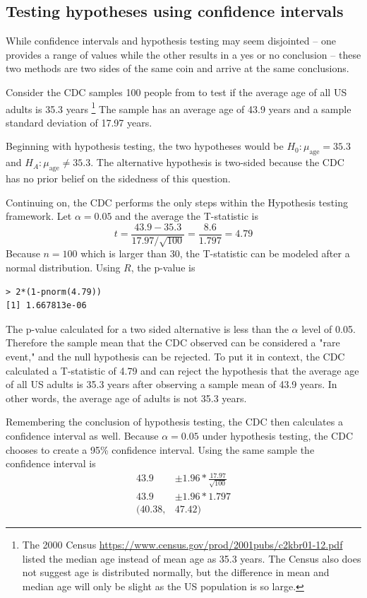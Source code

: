 \subsection{Testing hypotheses using confidence intervals}
\label{utilizingOurCI}

While confidence intervals and hypothesis testing may seem disjointed -- one provides a range of values while the other results in a yes or no conclusion -- these two methods are two sides of the same coin and arrive at the same conclusions. 
	
Consider the CDC  samples 100 people from  to test if the average age of all US adults is 35.3 years \footnote{The 2000 Census \url{https://www.census.gov/prod/2001pubs/c2kbr01-12.pdf} listed the median age instead of mean age as 35.3 years. The Census also does not suggest age is distributed normally, but the difference in mean and median age will only be slight as the US population is so large.} The sample has an average age of 43.9 years and a sample standard deviation of 17.97 years.

Beginning with hypothesis testing, the two hypotheses would be $H_0: \mu_{\mathrm{age}}=35.3$ and $H_A: \mu_{\mathrm{age}} \neq 35.3$. The alternative hypothesis is two-sided because the CDC has no prior belief on the sidedness of this question. 

Continuing on, the CDC performs the only steps within the Hypothesis testing framework. Let $\alpha = 0.05$ and the average the T-statistic is \[t = \frac{43.9-35.3}{17.97/\sqrt{100}}= \frac{8.6}{1.797} = 4.79\] Because $n=100$ which is larger than 30, the T-statistic can be modeled after a normal distribution. Using $R$, the p-value is \begin{verbatim}
> 2*(1-pnorm(4.79))
[1] 1.667813e-06
\end{verbatim}
The p-value calculated for a two sided alternative is less than the $\alpha$ level of 0.05. Therefore the sample mean that the CDC observed can be considered a "rare event," and the null hypothesis can be rejected. To put it in context, the CDC calculated a T-statistic of 4.79 and can reject the hypothesis that the average age of all US adults is 35.3 years after observing a sample mean of 43.9 years. In other words, the average age of adults is not 35.3 years. 

Remembering the conclusion of hypothesis testing, the CDC then calculates a confidence interval as well. Because $\alpha=0.05$ under hypothesis testing, the CDC chooses to create a 95\% confidence interval. Using the same sample the confidence interval is
\begin{align*}
43.9 &\pm 1.96 * \frac{17.97}{\sqrt{100}}\\
43.9 &\pm 1.96 * 1.797\\
(40.38,& 47.42)\
\end{align*} 

